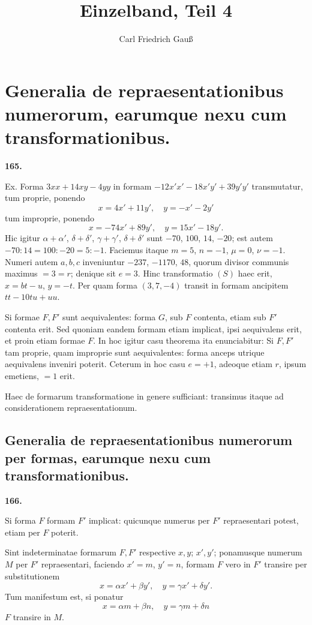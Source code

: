 \documentclass[12pt,a4paper]{article}
\theoremstyle{plain}
\theoremstyle{definition}
\theoremstyle{remark}
\begin{document}
\title{\textbf{Einzelband, Teil 4}}
\author{Carl Friedrich Gau\ss}
\date{}
\maketitle

\section*{Generalia de repraesentationibus numerorum, earumque nexu cum transformationibus.}

\textbf{165.}

Ex. Forma $3xx+14xy-4yy$ in formam $-12x'x'-18x'y'+39y'y'$ transmutatur, tum proprie, ponendo
\[x=4x'+11y',\quad y=-x'-2y'\]
tum improprie, ponendo
\[x=-74x'+89y',\quad y=15x'-18y'.\]
Hic igitur $\alpha+\alpha'$, $\delta+\delta'$, $\gamma+\gamma'$, $\delta+\delta'$ sunt $-70$, $100$, $14$, $-20$; est autem $-70:14=100:-20=5:-1$. Faciemus itaque $m=5$, $n=-1$, $\mu=0$, $\nu=-1$. Numeri autem $a,b,c$ inveniuntur $-237$, $-1170$, $48$, quorum divisor communis maximus $=3=r$; denique sit $e=3$. Hinc transformatio $(S)$ haec erit, $x=bt-u$, $y=-t$. Per quam forma $(3,7,-4)$ transit in formam ancipitem $tt-10tu+uu$.

Si formae $F,F'$ sunt aequivalentes: forma $G$, sub $F$ contenta, etiam sub $F'$ contenta erit. Sed quoniam eandem formam etiam implicat, ipsi aequivalens erit, et proin etiam formae $F$. In hoc igitur casu theorema ita enunciabitur: Si $F,F'$ tam proprie, quam improprie sunt aequivalentes: forma anceps utrique aequivalens inveniri poterit. Ceterum in hoc casu $e=+1$, adeoque etiam $r$, ipsum emetiens, $=1$ erit.

Haec de formarum transformatione in genere sufficiant: transimus itaque ad considerationem repraesentationum.

\subsection*{Generalia de repraesentationibus numerorum per formas, earumque nexu cum transformationibus.}

\textbf{166.}

Si forma $F$ formam $F'$ implicat: quicunque numerus per $F'$ repraesentari potest, etiam per $F$ poterit.

Sint indeterminatae formarum $F,F'$ respective $x,y$; $x',y'$; ponamusque numerum $M$ per $F'$ repraesentari, faciendo $x'=m$, $y'=n$, formam $F$ vero in $F'$ transire per substitutionem
\[x=\alpha x'+\beta y',\quad y=\gamma x'+\delta y'.\]
Tum manifestum est, si ponatur
\[x=\alpha m+\beta n,\quad y=\gamma m+\delta n\]
$F$ transire in $M$.
\end{document}
